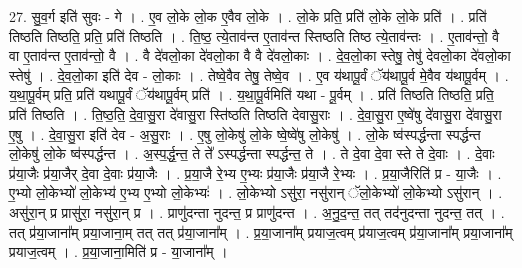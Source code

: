 \documentclass[17pt]{extarticle}
\begin{document}
27. सु॒व॒र्ग इति॑ सुवः - गे । . ए॒व लो॒के लो॒क ए॒वैव लो॒के । . लो॒के प्रति॒ प्रति॑ लो॒के लो॒के प्रति॑ । . प्रति॑ तिष्ठति तिष्ठति॒ प्रति॒ प्रति॑ तिष्ठति । . ति॒ष्ठ॒ त्ये॒ताव॑न्त ए॒ताव॑न्त स्तिष्ठति तिष्ठ त्ये॒ताव॑न्तः । . ए॒ताव॑न्तो॒ वै वा ए॒ताव॑न्त ए॒ताव॑न्तो॒ वै । . वै दे॑वलो॒का दे॑वलो॒का वै वै दे॑वलो॒काः । . दे॒व॒लो॒का स्तेषु॒ तेषु॑ देवलो॒का दे॑वलो॒का स्तेषु॑ । . दे॒व॒लो॒का इति॑ देव - लो॒काः । . तेष्वे॒वैव तेषु॒ तेष्वे॒व । . ए॒व य॑थापू॒र्वं ॅय॑थापू॒र्व मे॒वैव य॑थापू॒र्वम् । . य॒था॒पू॒र्वम् प्रति॒ प्रति॑ यथापू॒र्वं ॅय॑थापू॒र्वम् प्रति॑ । . य॒था॒पू॒र्वमिति॑ यथा - पू॒र्वम् । . प्रति॑ तिष्ठति तिष्ठति॒ प्रति॒ प्रति॑ तिष्ठति । . ति॒ष्ठ॒ति॒ दे॒वा॒सु॒रा दे॑वासु॒रा स्ति॑ष्ठति तिष्ठति देवासु॒राः । . दे॒वा॒सु॒रा ए॒ष्वे॑षु दे॑वासु॒रा दे॑वासु॒रा ए॒षु । . दे॒वा॒सु॒रा इति॑ देव - अ॒सु॒राः । . ए॒षु लो॒केषु॑ लो॒के ष्वे॒ष्वे॑षु लो॒केषु॑ । . लो॒के ष्व॑स्पर्द्धन्ता स्पर्द्धन्त लो॒केषु॑ लो॒के ष्व॑स्पर्द्धन्त । . अ॒स्प॒र्द्ध॒न्त॒ ते ते᳚ ऽस्पर्द्धन्ता स्पर्द्धन्त॒ ते । . ते दे॒वा दे॒वा स्ते ते दे॒वाः । . दे॒वाः प्र॑या॒जैः प्र॑या॒जैर् दे॒वा दे॒वाः प्र॑या॒जैः । . प्र॒या॒जै रे॒भ्य ए॒भ्यः प्र॑या॒जैः प्र॑या॒जै रे॒भ्यः । . प्र॒या॒जैरिति॑ प्र - या॒जैः । . ए॒भ्यो लो॒केभ्यो॑ लो॒केभ्य॑ ए॒भ्य ए॒भ्यो लो॒केभ्यः॑ । . लो॒केभ्यो ऽसु॑रा॒ नसु॑रान् ॅलो॒केभ्यो॑ लो॒केभ्यो ऽसु॑रान् । . असु॑रा॒न् प्र प्रासु॑रा॒ नसु॑रा॒न् प्र । . प्राणु॑दन्ता नुदन्त॒ प्र प्राणु॑दन्त । . अ॒नु॒द॒न्त॒ तत् तद॑नुदन्ता नुदन्त॒ तत् । . तत् प्र॑या॒जाना᳚म् प्रया॒जाना॒म् तत् तत् प्र॑या॒जाना᳚म् । . प्र॒या॒जाना᳚म् प्रयाज॒त्वम् प्र॑याज॒त्वम् प्र॑या॒जाना᳚म् प्रया॒जाना᳚म् प्रयाज॒त्वम् । . प्र॒या॒जाना॒मिति॑ प्र - या॒जाना᳚म् । \newline
\end{document}

